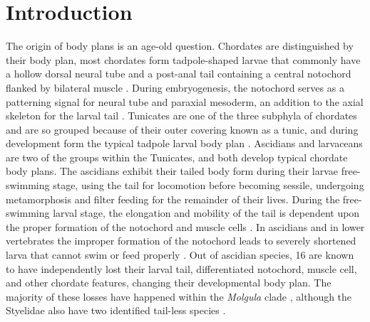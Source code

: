 \chapter{Introduction}
The origin of body plans is an age-old question. Chordates are distinguished by their body plan, most chordates form tadpole-shaped larvae that commonly have a hollow dorsal neural tube and a post-anal tail containing a central notochord flanked by bilateral muscle \cite{nishida_cell_2014}. During embryogenesis, the notochord serves as a patterning signal for neural tube and paraxial mesoderm, an addition to the axial skeleton for the larval tail \cite{jeffery_evolution_1999,stemple_structure_2005}. Tunicates are one of the three subphyla of chordates and are so grouped because of their outer covering known as a tunic, and during development form the typical tadpole larval body plan \cite{huber_evolution_2000}. Ascidians and larvaceans are two of the groups within the Tunicates, and both develop typical chordate body plans. The ascidians exhibit their tailed body form during their larvae free-swimming stage, using the tail for locomotion  before becoming sessile, undergoing metamorphosis and filter feeding for the remainder of their lives. During the free-swimming larval stage, the elongation and mobility of the tail is dependent upon the proper formation of the notochord and muscle cells \cite{satoh_ascidian_2003}. In ascidians and in lower vertebrates the improper formation of the notochord leads to severely shortened larva that cannot swim or feed properly \cite{di_gregorio_tail_2002,jiang_ascidian_2005,stemple_structure_2005}. Out of   ascidian species, 16 are known to have independently lost their larval tail, differentiated notochord, muscle cell, and other chordate features, changing their developmental body plan. The majority of these losses have happened within the \textit{Molgula} clade \cite{berrill_studies_1931,swalla_interspecific_1990}, although the Styelidae also have two identified tail-less species \cite{huber_evolution_2000}.

